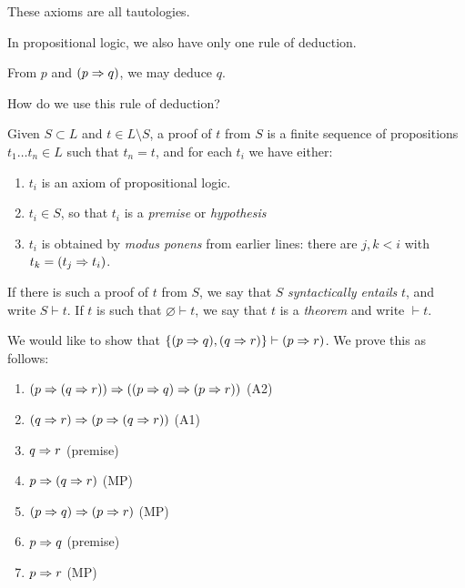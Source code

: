 \documentclass{article}
\begin{document}
\begin{note}
	These axioms are all tautologies.
\end{note}

In propositional logic, we also have only one rule of deduction.

\begin{definition}
	\label{modus-ponens}
    From $p$ and $(p \Rightarrow q)$, we may deduce $q$.
\end{definition}

How do we use this rule of deduction?

\begin{definition}[Proof]
	\label{proof-propositional-logic}
    Given $S \subset L$ and $t \in L \setminus S$, a proof of $t$ from $S$ is a finite sequence of propositions $t_1 \dots t_n \in L$ such that $t_n = t$, and for each $t_i$ we have either:
    \begin{enumerate}
    	\item $t_i$ is an axiom of propositional logic.
    	\item $t_i \in S$, so that $t_i$ is a \textit{premise} or \textit{hypothesis}
    	\item $t_i$ is obtained by \textit{modus ponens} from earlier lines: there are $j, k < i$ with $t_k = (t_j \Rightarrow t_i)$.
	\end{enumerate}
	If there is such a proof of $t$ from $S$, we say that $S$ \textit{syntactically entails} $t$, and write $S \vdash t$. If $t$ is such that $\varnothing \vdash t$, we say that $t$ is a \textit{theorem} and write $\vdash t$. 
\end{definition}

\begin{example}
    We would like to show that $\left\lbrace (p \Rightarrow q), (q \Rightarrow r) \right\rbrace \vdash (p \Rightarrow r)$. We prove this as follows:
    \begin{enumerate}
    \item $(p \Rightarrow (q \Rightarrow r)) \Rightarrow ((p \Rightarrow q) \Rightarrow (p \Rightarrow r))$ \hfill (A2)
    \item $(q \Rightarrow r) \Rightarrow (p \Rightarrow (q \Rightarrow r))$ \hfill (A1)
    \item $q \Rightarrow r$ \hfill (premise)
    \item $p \Rightarrow (q \Rightarrow r)$ \hfill (MP)
    \item $(p \Rightarrow q) \Rightarrow (p \Rightarrow r)$ \hfill (MP)
    \item $p \Rightarrow q$ \hfill (premise)
    \item $p \Rightarrow r$ \hfill (MP)
	\end{enumerate}
\end{example}
\end{document}
